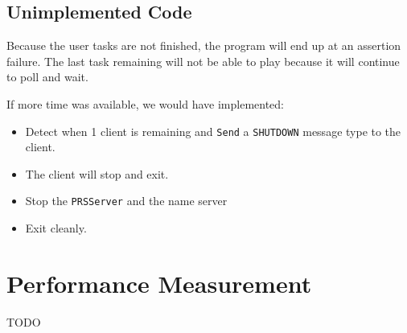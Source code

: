 \documentclass[letterpaper, 11pt]{article}
\begin{document}
\subsection{Unimplemented Code%
  \label{unimplemented-code}%
}

Because the user tasks are not finished, the program will end up at an assertion failure. The last task remaining will not be able to play because it will continue to poll and wait.

If more time was available, we would have implemented:
%
\begin{itemize}

\item Detect when 1 client is remaining and \texttt{Send} a \texttt{SHUTDOWN} message type to the client.

\item The client will stop and exit.

\item Stop the \texttt{PRSServer} and the name server

\item Exit cleanly.

\end{itemize}


\section{Performance Measurement%
  \label{performance-measurement}%
}

TODO
\end{document}
